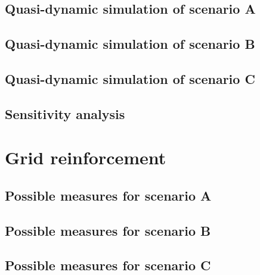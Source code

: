 \subsection{Quasi-dynamic simulation of scenario A}

\subsection{Quasi-dynamic simulation of scenario B}

\subsection{Quasi-dynamic simulation of scenario C}

\subsection{Sensitivity analysis}

\section{Grid reinforcement}

\subsection{Possible measures for scenario A}
\subsection{Possible measures for scenario B}
\subsection{Possible measures for scenario C}%
